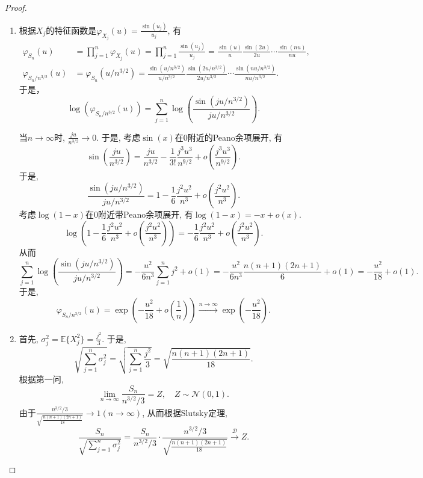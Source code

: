 \documentclass[UTF8, a4paper]{article}
\begin{document}
\begin{proof}
\begin{enumerate}
    \item 根据\(X_j\)的特征函数是\(\varphi_{X_j}(u) = \frac{\sin(u_j)}{u_j}\), 有
    \begin{align*}
        \varphi_{S_n}(u) &= \prod_{j=1}^{n}\varphi_{X_j}(u) = \prod_{j=1}^{n}\frac{\sin(u_j)}{u_j} = \frac{\sin(u)}{u} \frac{\sin(2u)}{2u} \cdots \frac{\sin(nu)}{nu} ,\\
        \varphi_{S_n/n^{3/2}}(u) &= \varphi_{S_n}(u/n^{3/2}) = \frac{\sin(u/n^{3/2})}{u/n^{3/2}} \frac{\sin(2u/n^{3/2})}{2u/n^{3/2}} \cdots \frac{\sin(nu/n^{3/2})}{nu/n^{3/2} }.
    \end{align*}
    于是， 
    $$
    \log(\varphi_{S_n/n^{3/2}}(u)) = \sum_{j=1}^{n}\log\left(\frac{\sin(ju/n^{3/2})}{ju/n^{3/2}}\right) .
    $$
    
    当\(n\to \infty\)时, \(\frac{ju}{n^{3/2}} \to 0\). 于是, 考虑\(\sin(x)\)在\(0\)附近的Peano余项展开, 有
    $$
    \sin\left(\frac{ju}{n^{3/2}}\right) = \frac{ju}{n^{3/2}} - \frac{1}{3!} \frac{j^3 u^3}{n^{9/2}} + o\left(\frac{j^3 u^3}{n^{9/2}}\right).
    $$
    于是, 
    $$
    \frac{\sin(ju/n^{3/2})}{ju/n^{3/2}} = 1 - \frac{1}{6} \frac{j^2u^2}{n^3} + o\left(\frac{j^2u^2}{n^3}\right).
    $$
    考虑\(\log(1 - x)\)在\(0\)附近带Peano余项展开, 有\(\log(1 - x) = -x + o(x)\).
    $$
    \log\left(1 - \frac{1}{6} \frac{j^2u^2}{n^3} + o\left(\frac{j^2u^2}{n^3}\right)\right) = - \frac{1}{6} \frac{j^2u^2}{n^3} + o\left(\frac{j^2u^2}{n^3}\right).
    $$
    从而 
    $$
    \sum_{j=1}^{n}\log\left(\frac{\sin(ju/n^{3/2})}{ju/n^{3/2}}\right) = -\frac{u^2}{6n^3} \sum_{j=1}^{n}j^2 + o\left(1\right) = -\frac{u^2}{6n^3} \frac{n(n+1)(2n+1)}{6} + o\left(1\right)= -\frac{u^2}{18} + o\left(1\right).
    $$
    于是,
    $$
    \varphi_{S_n/n^{3/2}}(u) = \exp\left(-\frac{u^2}{18} + o\left(\frac{1}{n}\right)\right) \xrightarrow{n\to \infty} \exp\left(-\frac{u^2}{18}\right).
    $$
    \item 首先, \(\sigma_j^2 = \mathbb{E}\{X_j^2\} = \frac{j^2}{3}\).
    于是, $$
    \sqrt{\sum_{j=1}^{n}\sigma_j^2} = \sqrt{\sum_{j=1}^{n}\frac{j^2}{3}} = \sqrt{\frac{n(n+1)(2n+1)}{18}}.
    $$
    根据第一问, 
    $$
    \lim_{n\to\infty}\frac{S_n}{n^{3/2}/3} = Z, \quad Z \sim \mathcal{N}(0, 1).
    $$
    由于\(\frac{n^{3/2}/3}{\sqrt{\frac{n(n+1)(2n+1)}{18}}} \to 1 (n\to \infty)\),
    从而根据Slutsky定理, 
    $$
    \frac{S_n}{\sqrt{\sum_{j=1}^n\sigma_j^2}} = \frac{S_n}{n^{3/2}/3} \cdot \frac{n^{3/2}/3}{\sqrt{\frac{n(n+1)(2n+1)}{18}}} \xrightarrow{\mathcal{D}} Z.
    $$
\end{enumerate}
\end{proof}
\end{document}
